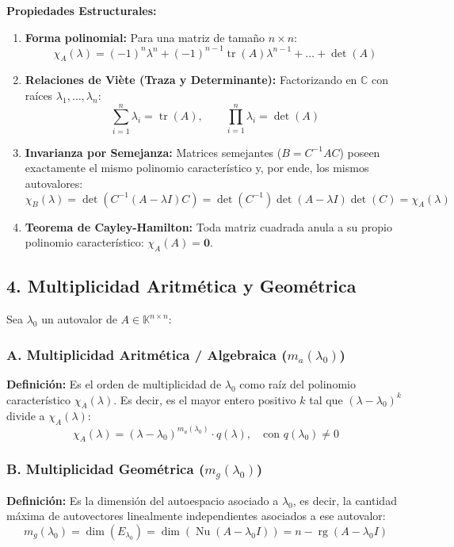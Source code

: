 \documentclass[11pt,a4paper]{article}
\begin{document}
\textbf{Propiedades Estructurales:}
\begin{enumerate}
    \item \textbf{Forma polinomial:} Para una matriz de tamaño $n \times n$:
    \[
    \chi_A(\lambda) = (-1)^n \lambda^n + (-1)^{n-1} \operatorname{tr}(A) \lambda^{n-1} + \dots + \det(A)
    \]
    \item \textbf{Relaciones de Viète (Traza y Determinante):} Factorizando en $\mathbb{C}$ con raíces $\lambda_1, \dots, \lambda_n$:
    \[
    \sum_{i=1}^n \lambda_i = \operatorname{tr}(A), \qquad \prod_{i=1}^n \lambda_i = \det(A)
    \]
    \item \textbf{Invarianza por Semejanza:} Matrices semejantes ($B = C^{-1} A C$) poseen exactamente el mismo polinomio característico y, por ende, los mismos autovalores:
    \[
    \chi_B(\lambda) = \det(C^{-1}(A - \lambda I)C) = \det(C^{-1})\det(A - \lambda I)\det(C) = \chi_A(\lambda)
    \]
    \item \textbf{Teorema de Cayley-Hamilton:} Toda matriz cuadrada anula a su propio polinomio característico: $\chi_A(A) = \mathbf{0}$.
\end{enumerate}

\subsection*{4. Multiplicidad Aritmética y Geométrica}

Sea $\lambda_0$ un autovalor de $A \in \mathbb{K}^{n \times n}$:

\subsubsection*{A. Multiplicidad Aritmética / Algebraica ($m_a(\lambda_0)$)}
\textbf{Definición:} Es el orden de multiplicidad de $\lambda_0$ como raíz del polinomio característico $\chi_A(\lambda)$. Es decir, es el mayor entero positivo $k$ tal que $(\lambda - \lambda_0)^k$ divide a $\chi_A(\lambda)$:
\[
\chi_A(\lambda) = (\lambda - \lambda_0)^{m_a(\lambda_0)} \cdot q(\lambda), \quad \text{con } q(\lambda_0) \neq 0
\]

\subsubsection*{B. Multiplicidad Geométrica ($m_g(\lambda_0)$)}
\textbf{Definición:} Es la dimensión del autoespacio asociado a $\lambda_0$, es decir, la cantidad máxima de autovectores linealmente independientes asociados a ese autovalor:
\[
m_g(\lambda_0) = \dim(E_{\lambda_0}) = \dim(\operatorname{Nu}(A - \lambda_0 I)) = n - \operatorname{rg}(A - \lambda_0 I)
\]
\end{document}
